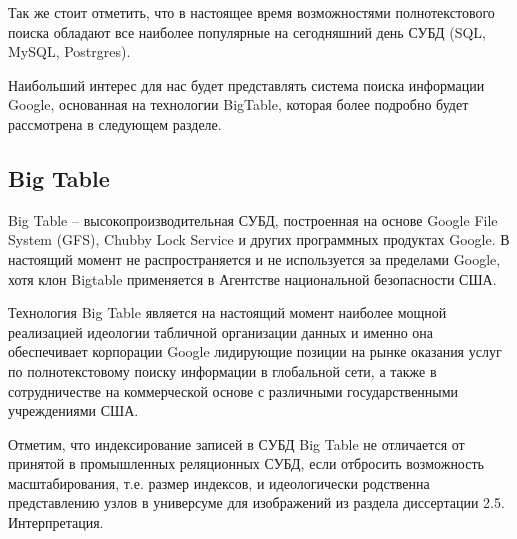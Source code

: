 Так же стоит отметить, что в настоящее время возможностями полнотекстового поиска обладают все наиболее популярные на сегодняшний день СУБД (SQL, MySQL, Postrgres).

Наибольший интерес для нас будет представлять система поиска информации Google, основанная на технологии BigTable, которая более подробно будет рассмотрена  в следующем разделе. 
\subsection{Big Table}
Big Table -- высокопроизводительная СУБД, построенная на основе Google File System (GFS), Chubby Lock Service и  других программных продуктах Google. В настоящий момент не распространяется и не используется за пределами Google, хотя клон Bigtable применяется в Агентстве национальной безопасности США.

Технология  Big Table  является на настоящий момент наиболее мощной реализацией идеологии табличной организации данных и именно она обеспечивает корпорации Google лидирующие позиции на рынке оказания услуг по полнотекстовому поиску информации в глобальной сети, а также в сотрудничестве на коммерческой основе с различными государственными учреждениями США.

Отметим, что индексирование записей в  СУБД  Big Table  не отличается от принятой в промышленных реляционных СУБД, если отбросить возможность масштабирования, т.е. размер индексов, и идеологически родственна представлению узлов в универсуме для изображений из раздела диссертации 2.5. Интерпретация. 

%


